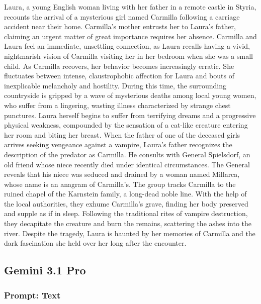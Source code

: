 \documentclass{article} %
\begin{document}
Laura, a young English woman living with her father in a remote castle in Styria, recounts the arrival of a mysterious girl named Carmilla following a carriage accident near their home. Carmilla’s mother entrusts her to Laura’s father, claiming an urgent matter of great importance requires her absence. Carmilla and Laura feel an immediate, unsettling connection, as Laura recalls having a vivid, nightmarish vision of Carmilla visiting her in her bedroom when she was a small child. As Carmilla recovers, her behavior becomes increasingly erratic. She fluctuates between intense, claustrophobic affection for Laura and bouts of inexplicable melancholy and hostility. \textcolor{skipred}{During this time, the surrounding countryside is gripped by a wave of mysterious deaths among local young women, who suffer from a lingering, wasting illness characterized by strange chest punctures.} Laura herself begins to suffer from terrifying dreams and a progressive physical weakness, compounded by the sensation of a cat-like creature entering her room and biting her breast. \textcolor{skipred}{When the father of one of the deceased girls arrives seeking vengeance against a vampire, Laura’s father recognizes the description of the predator as Carmilla.} He consults with General Spielsdorf, an old friend whose niece recently died under identical circumstances. \textcolor{skipred}{The General reveals that his niece was seduced and drained by a woman named Millarca, whose name is an anagram of Carmilla’s.} The group tracks Carmilla to the ruined chapel of the Karnstein family, a long-dead noble line. With the help of the local authorities, they exhume Carmilla’s grave, finding her body preserved and supple as if in sleep. Following the traditional rites of vampire destruction, they decapitate the creature and burn the remains, scattering the ashes into the river. Despite the tragedy, Laura is haunted by her memories of Carmilla and the dark fascination she held over her long after the encounter.


\subsection{Gemini 3.1 Pro}

\subsubsection{Prompt: Text}
\end{document}
